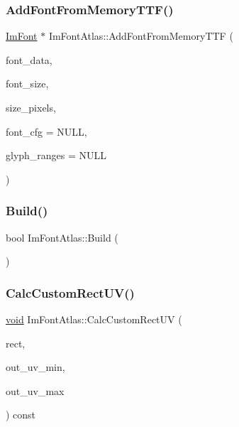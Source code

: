 \mbox{\label{structImFontAtlas_adb01397920998a18e25bd8fed3f791a7}} 
\subsubsection{\texorpdfstring{Add\+Font\+From\+Memory\+T\+T\+F()}{AddFontFromMemoryTTF()}}
{\footnotesize\ttfamily \hyperlink{structImFont}{Im\+Font} $\ast$ Im\+Font\+Atlas\+::\+Add\+Font\+From\+Memory\+T\+TF (\begin{DoxyParamCaption}\item[{\hyperlink{imgui__impl__opengl3__loader_8h_ac668e7cffd9e2e9cfee428b9b2f34fa7}{void} $\ast$}]{font\+\_\+data,  }\item[{int}]{font\+\_\+size,  }\item[{float}]{size\+\_\+pixels,  }\item[{const \hyperlink{structImFontConfig}{Im\+Font\+Config} $\ast$}]{font\+\_\+cfg = {\ttfamily NULL},  }\item[{const Im\+Wchar $\ast$}]{glyph\+\_\+ranges = {\ttfamily NULL} }\end{DoxyParamCaption})}

\mbox{\label{structImFontAtlas_a81e39e30dffa4dd7e458a53297451e27}} 
\subsubsection{\texorpdfstring{Build()}{Build()}}
{\footnotesize\ttfamily bool Im\+Font\+Atlas\+::\+Build (\begin{DoxyParamCaption}{ }\end{DoxyParamCaption})}

\mbox{\label{structImFontAtlas_a66bb70a3c3dab00bd714fc52e2195882}} 
\subsubsection{\texorpdfstring{Calc\+Custom\+Rect\+U\+V()}{CalcCustomRectUV()}}
{\footnotesize\ttfamily \hyperlink{imgui__impl__opengl3__loader_8h_ac668e7cffd9e2e9cfee428b9b2f34fa7}{void} Im\+Font\+Atlas\+::\+Calc\+Custom\+Rect\+UV (\begin{DoxyParamCaption}\item[{const \hyperlink{structImFontAtlasCustomRect}{Im\+Font\+Atlas\+Custom\+Rect} $\ast$}]{rect,  }\item[{\hyperlink{structImVec2}{Im\+Vec2} $\ast$}]{out\+\_\+uv\+\_\+min,  }\item[{\hyperlink{structImVec2}{Im\+Vec2} $\ast$}]{out\+\_\+uv\+\_\+max }\end{DoxyParamCaption}) const}

